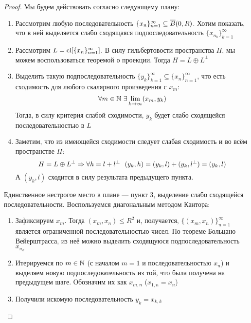 \begin{proof}
	Мы будем действовать согласно следующему плану:
	\begin{enumerate}
		\item Рассмотрим любую последовательность $\{x_n\}_{n = 1}^\infty \subseteq \overline{B}(0, R)$. Хотим показать, что в ней выделяется слабо сходящаяся подпоследовательность $\{x_{n_k}\}_{k = 1}^\infty$
		
		\item Рассмотрим $L = \operatorname{cl} [\{x_n\}_{n = 1}^\infty]$. В силу гильбертовости пространства $H$, мы можем воспользоваться теоремой о проекции. Тогда $H = L \oplus L^\bot$
		
		\item Выделить такую подпоследовательность $\{y_k\}_{k = 1}^\infty \subseteq \{x_n\}_{n = 1}^\infty$, что есть сходимость для любого скалярного произведения с $x_m$:
		\[
			\forall m \in \mathbb{N}\ \exists \lim_{k \to \infty} (x_m, y_k)
		\]
		Тогда, в силу критерия слабой сходимости, $y_k$ будет слабо сходящейся последовательностью в $L$
		
		\item Заметим, что из имеющейся сходимости следует слабая сходимость и во всём пространстве $H$:
		\[
			 H = L \oplus L^\bot \Rightarrow \forall h = l + l^\bot\ \ (y_k, h) = (y_k, l) + (y_k, l^\bot) = (y_k, l)
		\]
		А $(y_k, l)$ сходится в силу результата предыдущего пункта.
	\end{enumerate}
	Единственное нестрогое место в плане --- пункт 3, выделение слабо сходящейся последовательности. Воспользуемся диагональным методом Кантора:
	\begin{enumerate}
		\item Зафиксируем $x_m$. Тогда $(x_m, x_n) \le R^2$ и, получается, $\{(x_m, x_n)\}_{n = 1}^\infty$ является ограниченной последовательностью чисел. По теореме Больцано-Вейерштрасса, из неё можно выделить сходящуюся подпоследовательность $x_{n_k}$
		
		\item Итерируемся по $m \in \mathbb{N}$ (с началом $m = 1$ и последовательностью $x_n$) и выделяем новую подпоследовательность из той, что была получена на предыдущем шаге. Обозначим их как $x_{m, n}$ ($x_{1, n} = x_n$)
		
		\item Получили искомую последовательность $y_k = x_{k, k}$
	\end{enumerate}
\end{proof}